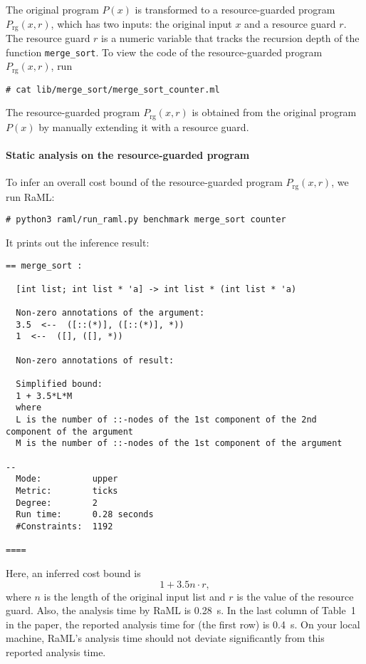 The original program $P(x)$ is transformed to a resource-guarded program
$P_{\mathrm{rg}}(x, r)$, which has two inputs: the original input $x$ and a
resource guard $r$.
%
The resource guard $r$ is a numeric variable that tracks the recursion depth of
the function \texttt{merge\_sort}.
%
To view the code of the resource-guarded program $P_{\mathrm{rg}}(x, r)$, run
\begin{verbatim}
# cat lib/merge_sort/merge_sort_counter.ml
\end{verbatim}
%
The resource-guarded program $P_{\mathrm{rg}}(x, r)$ is obtained from the
original program $P(x)$ by manually extending it with a resource guard.

\paragraph{Static analysis on the resource-guarded program}

To infer an overall cost bound of the resource-guarded program
$P_{\mathrm{rg}}(x, r)$, we run RaML:
\begin{verbatim}
# python3 raml/run_raml.py benchmark merge_sort counter
\end{verbatim}
%
It prints out the inference result:
\begin{Verbatim}[fontsize=\footnotesize]
== merge_sort :

  [int list; int list * 'a] -> int list * (int list * 'a)

  Non-zero annotations of the argument:
  3.5  <--  ([::(*)], ([::(*)], *))
  1  <--  ([], ([], *))

  Non-zero annotations of result:

  Simplified bound:
  1 + 3.5*L*M
  where
  L is the number of ::-nodes of the 1st component of the 2nd component of the argument
  M is the number of ::-nodes of the 1st component of the argument

--
  Mode:          upper
  Metric:        ticks
  Degree:        2
  Run time:      0.28 seconds
  #Constraints:  1192

====
\end{Verbatim}
%
Here, an inferred cost bound is
\begin{equation}
  1 + 3.5 n \cdot r,
\end{equation}
where $n$ is the length of the original input list and $r$ is the value of the
resource guard.
%
Also, the analysis time by RaML is \qty{0.28}{\second}.
%
In the last column of Table~1 in the paper, the reported analysis time for
\mergesort{} (the first row) is \qty{0.4}{\second}.
%
On your local machine, RaML's analysis time should not deviate significantly
from this reported analysis time.

